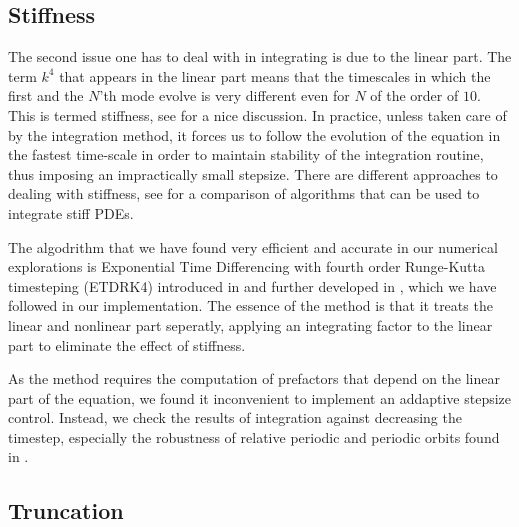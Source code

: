 \subsection{Stiffness}

The second issue one has to deal with in integrating  is due to the linear part.
The term $k^4$ that appears in the linear part means that the timescales in which the first
and the $N$'th mode evolve is very different even for $N$ of the order of $10$. This
is termed stiffness, see  for a nice discussion. In practice, unless taken care
of by the integration method, it forces us to follow the evolution of the equation in the
fastest time-scale in order to maintain stability of the integration routine, thus imposing an 
impractically small stepsize. There are different approaches to dealing with stiffness,
see  for a comparison of algorithms that can be used to integrate stiff PDEs.

The algodrithm that we have found very efficient and accurate in our numerical explorations
is Exponential Time Differencing with fourth order Runge-Kutta timesteping (ETDRK4)
introduced in  and further developed in , which we have
followed in our implementation. The essence of the method is that it treats the linear
and nonlinear part seperatly, applying an integrating factor to the linear part to eliminate
the effect of stiffness.

As the method requires the computation of prefactors that depend on the linear part of
the equation, we found it inconvenient to implement an addaptive stepsize control. Instead,
we check the results of integration against decreasing the timestep, especially the
robustness of relative periodic and periodic orbits found in . 

\subsection{Truncation}

